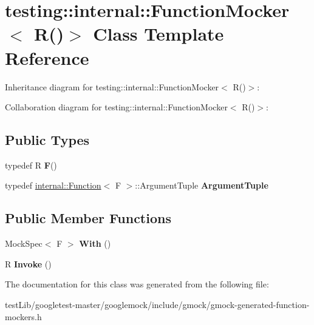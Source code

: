 \hypertarget{classtesting_1_1internal_1_1FunctionMocker_3_01R_07_08_4}{}\section{testing\+:\+:internal\+:\+:Function\+Mocker$<$ R()$>$ Class Template Reference}
\label{classtesting_1_1internal_1_1FunctionMocker_3_01R_07_08_4}


Inheritance diagram for testing\+:\+:internal\+:\+:Function\+Mocker$<$ R()$>$\+:


Collaboration diagram for testing\+:\+:internal\+:\+:Function\+Mocker$<$ R()$>$\+:
\subsection*{Public Types}
\begin{DoxyCompactItemize}
\item 
\mbox{\label{classtesting_1_1internal_1_1FunctionMocker_3_01R_07_08_4_a2c1d7da413176d87405227df90a95521}} 
typedef R {\bfseries F}()
\item 
\mbox{\label{classtesting_1_1internal_1_1FunctionMocker_3_01R_07_08_4_a5a279e0d8414bf0809405c06a0725b66}} 
typedef \hyperlink{structtesting_1_1internal_1_1Function}{internal\+::\+Function}$<$ F $>$\+::Argument\+Tuple {\bfseries Argument\+Tuple}
\end{DoxyCompactItemize}
\subsection*{Public Member Functions}
\begin{DoxyCompactItemize}
\item 
\mbox{\label{classtesting_1_1internal_1_1FunctionMocker_3_01R_07_08_4_a4bd0ee604f6917fcfe8aae52a1f47cf3}} 
Mock\+Spec$<$ F $>$ {\bfseries With} ()
\item 
\mbox{\label{classtesting_1_1internal_1_1FunctionMocker_3_01R_07_08_4_a8096a10aea2ffc6a78d0437855d2ef10}} 
R {\bfseries Invoke} ()
\end{DoxyCompactItemize}


The documentation for this class was generated from the following file\+:\begin{DoxyCompactItemize}
\item 
test\+Lib/googletest-\/master/googlemock/include/gmock/gmock-\/generated-\/function-\/mockers.\+h\end{DoxyCompactItemize}
